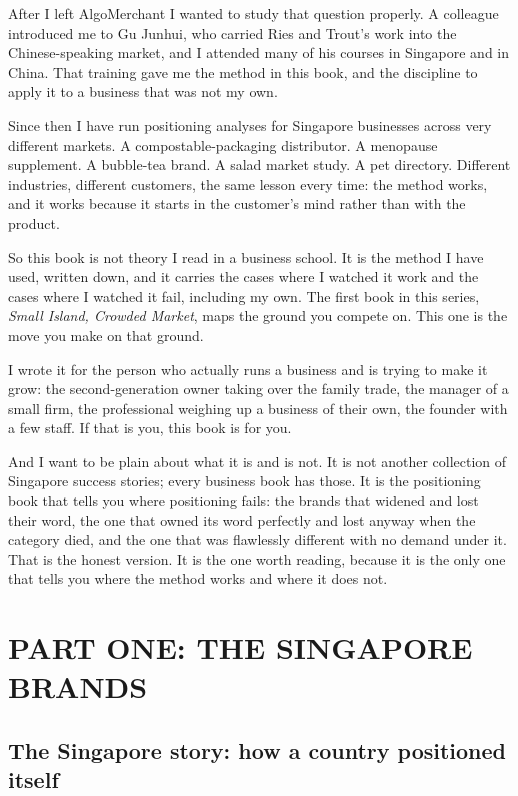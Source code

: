 \documentclass[10pt,twoside,openany]{memoir}
\begin{document}
After I left AlgoMerchant I wanted to study that question properly. A
colleague introduced me to Gu Junhui, who carried Ries and Trout's work
into the Chinese-speaking market, and I attended many of his courses in
Singapore and in China. That training gave me the method in this book,
and the discipline to apply it to a business that was not my own.

Since then I have run positioning analyses for Singapore businesses
across very different markets. A compostable-packaging distributor. A
menopause supplement. A bubble-tea brand. A salad market study. A pet
directory. Different industries, different customers, the same lesson
every time: the method works, and it works because it starts in the
customer's mind rather than with the product.

So this book is not theory I read in a business school. It is the method
I have used, written down, and it carries the cases where I watched it
work and the cases where I watched it fail, including my own. The first
book in this series, \emph{Small Island, Crowded Market}, maps the
ground you compete on. This one is the move you make on that ground.

I wrote it for the person who actually runs a business and is trying to
make it grow: the second-generation owner taking over the family trade,
the manager of a small firm, the professional weighing up a business of
their own, the founder with a few staff. If that is you, this book is
for you.

And I want to be plain about what it is and is not. It is not another
collection of Singapore success stories; every business book has those.
It is the positioning book that tells you where positioning fails: the
brands that widened and lost their word, the one that owned its word
perfectly and lost anyway when the category died, and the one that was
flawlessly different with no demand under it. That is the honest
version. It is the one worth reading, because it is the only one that
tells you where the method works and where it does not.

\part{PART ONE: THE SINGAPORE
BRANDS}\label{part-one-the-singapore-brands}

\FloatBarrier
\chapter{The Singapore story: how a country positioned
itself}\label{the-singapore-story-how-a-country-positioned-itself}
\end{document}
